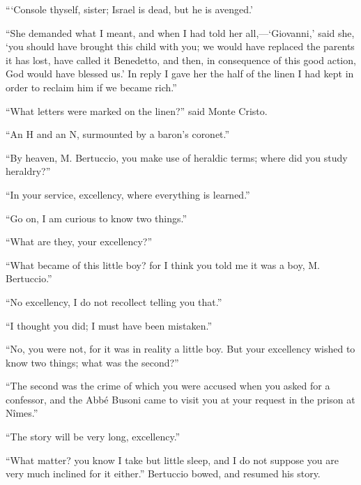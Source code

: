 “‘Console thyself, sister; Israel is dead, but he is avenged.’

“She demanded what I meant, and when I had told her all,—‘Giovanni,’
said she, ‘you should have brought this child with you; we would have
replaced the parents it has lost, have called it Benedetto, and then,
in consequence of this good action, God would have blessed us.’ In
reply I gave her the half of the linen I had kept in order to reclaim
him if we became rich.”

“What letters were marked on the linen?” said Monte Cristo.

“An H and an N, surmounted by a baron’s coronet.”

“By heaven, M. Bertuccio, you make use of heraldic terms; where did you
study heraldry?”

“In your service, excellency, where everything is learned.”

“Go on, I am curious to know two things.”

“What are they, your excellency?”

“What became of this little boy? for I think you told me it was a boy,
M. Bertuccio.”

“No excellency, I do not recollect telling you that.”

“I thought you did; I must have been mistaken.”

“No, you were not, for it was in reality a little boy. But your
excellency wished to know two things; what was the second?”

“The second was the crime of which you were accused when you asked for
a confessor, and the Abbé Busoni came to visit you at your request in
the prison at Nîmes.”

“The story will be very long, excellency.”

“What matter? you know I take but little sleep, and I do not suppose
you are very much inclined for it either.” Bertuccio bowed, and resumed
his story.

